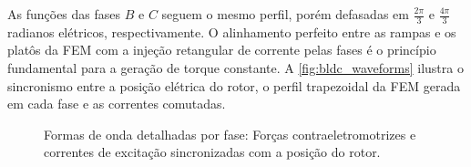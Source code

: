 As funções das fases $B$ e $C$ seguem o mesmo perfil, porém defasadas em $\frac{2\pi}{3}$ e $\frac{4\pi}{3}$ radianos elétricos, respectivamente. O alinhamento perfeito entre as rampas e os platôs da FEM com a injeção retangular de corrente pelas fases é o princípio fundamental para a geração de torque constante. A \autoref{fig:bldc_waveforms} ilustra o sincronismo entre a posição elétrica do rotor, o perfil trapezoidal da FEM gerada em cada fase e as correntes comutadas.


\begin{figure}[H]
    \centering
    \caption{Formas de onda detalhadas por fase: Forças contraeletromotrizes e correntes de excitação sincronizadas com a posição do rotor.}
    \vspace{0.4cm}
    
\end{figure}
